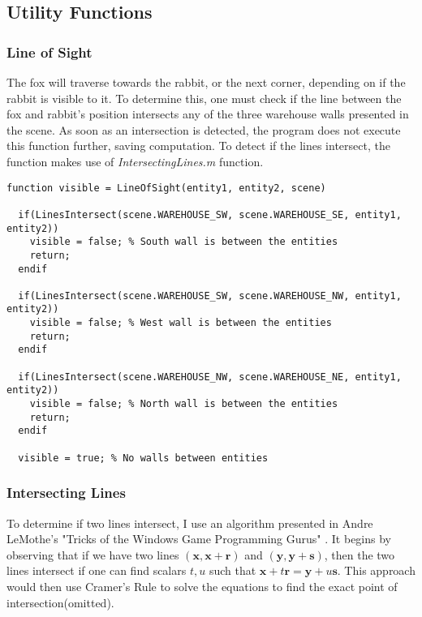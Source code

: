 \documentclass[11pt]{article}
\begin{document}
\subsection{Utility Functions}

\subsubsection{Line of Sight}
The fox will traverse towards the rabbit, or the next corner, depending on if the rabbit is visible to it. To determine this, one must check if the line between the fox and rabbit's position intersects any of the three warehouse walls presented in the scene. As soon as an intersection is detected, the program does not execute this function further, saving computation. To detect if the lines intersect, the function makes use of \textit{IntersectingLines.m} function.

\begin{lstlisting}
function visible = LineOfSight(entity1, entity2, scene)

  if(LinesIntersect(scene.WAREHOUSE_SW, scene.WAREHOUSE_SE, entity1, entity2))
    visible = false; % South wall is between the entities
    return;
  endif
 
  if(LinesIntersect(scene.WAREHOUSE_SW, scene.WAREHOUSE_NW, entity1, entity2))
    visible = false; % West wall is between the entities
    return;
  endif
  
  if(LinesIntersect(scene.WAREHOUSE_NW, scene.WAREHOUSE_NE, entity1, entity2))
    visible = false; % North wall is between the entities
    return;
  endif
  
  visible = true; % No walls between entities
\end{lstlisting}

\subsubsection{Intersecting Lines}
To determine if two lines intersect, I use an algorithm presented in Andre LeMothe's "Tricks of the Windows Game Programming Gurus" \cite{1}. It begins by observing that if we have two lines $(\textbf{x}, \textbf{x}+\textbf{r})$ and $(\textbf{y}, \textbf{y}+\textbf{s})$, then the two lines intersect if one can find scalars $t, u$ such that $\textbf{x} + t\textbf{r} = \textbf{y} + u\textbf{s} $. This approach would then use Cramer's Rule to solve the equations to find the exact point of intersection(omitted).
\end{document}
